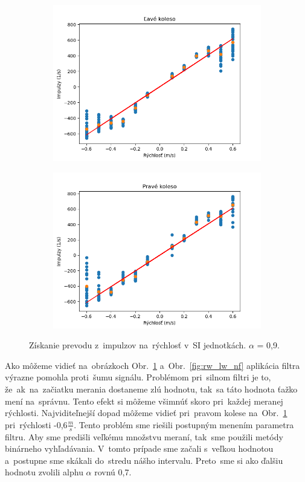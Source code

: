 \begin{figure}[!htbp]
	\begin{subfigure}{0.5\textwidth}
		\includegraphics[width=\textwidth]{img/lw_09250.png}
	\end{subfigure}
	\hfill
	\begin{subfigure}{0.5\textwidth}
		\includegraphics[width=\textwidth]{img/rw_09250.png}
	\end{subfigure}
	\caption{Získanie prevodu z~impulzov na~rýchlosť v~SI jednotkách. $\alpha$ = 0,9.}
	\label{fig:rw_lw_09250}
\end{figure}

Ako môžeme vidieť na~obrázkoch Obr.~\ref{fig:rw_lw_09250} a~Obr.~\ref{fig:rw_lw_nf} aplikácia filtra výrazne pomohla proti~šumu signálu.
Problémom pri~silnom filtri je to, že~ak~na~začiatku merania dostaneme zlú hodnotu, tak~sa táto hodnota ťažko mení na~správnu. Tento
efekt si môžeme všimnúť skoro pri~každej meranej rýchlosti. Najviditeľnejší dopad môžeme vidieť pri~pravom kolese
na~Obr.~\ref{fig:rw_lw_09250} pri~rýchlosti -0,6$\frac{m}{s}$. Tento problém sme riešili postupným menením parametra filtru.
Aby sme predišli veľkému množstvu meraní, tak~sme použili metódy binárneho vyhľadávania. V~tomto prípade sme začali s~veľkou hodnotou
a~postupne sme skákali do~stredu nášho intervalu. Preto~sme si ako ďalšiu hodnotu zvolili alphu $\alpha$ rovnú 0,7.

